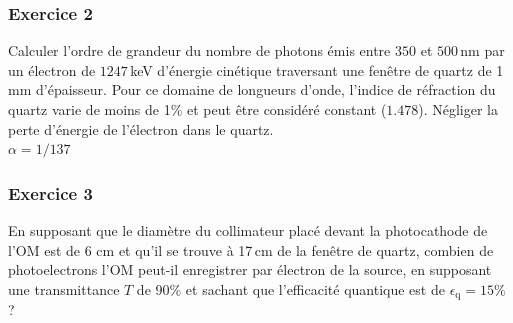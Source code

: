 \subsubsection{Exercice 2}
Calculer l'ordre de grandeur du nombre de photons émis entre $350$ et $500$\,nm par un électron de $1247$\,keV d'énergie cinétique traversant une fenêtre de quartz de 1\,mm d'épaisseur. Pour ce domaine de longueurs d’onde, l'indice de réfraction du quartz varie de moins de 1\% et peut être considéré constant ($1.478$). Négliger la perte d'énergie de l'électron dans le quartz.\\ $\alpha = 1/137$


\subsubsection{Exercice 3}
En supposant que le diamètre du collimateur placé devant la photocathode de l'OM est de 6 cm et qu'il se trouve à 17\,cm de la fenêtre de quartz, combien de photoelectrons l'OM peut-il enregistrer par électron de la source, en supposant une transmittance $T$ de 90\% et sachant que l'efficacité quantique est de $\epsilon_\mathrm{q}=15\%$?


